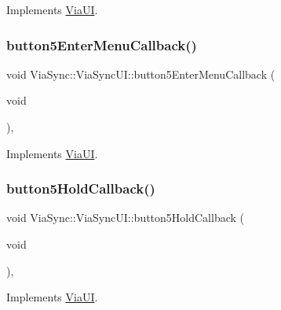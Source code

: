 Implements \mbox{\hyperlink{class_via_u_i_a4925f089aa720ca88d84246f434112e9}{Via\+UI}}.

\mbox{\label{class_via_sync_1_1_via_sync_u_i_ad02cd6e9495afcd256a3b3475809bf5b}} 
\subsubsection{\texorpdfstring{button5\+Enter\+Menu\+Callback()}{button5EnterMenuCallback()}}
{\footnotesize\ttfamily void Via\+Sync\+::\+Via\+Sync\+U\+I\+::button5\+Enter\+Menu\+Callback (\begin{DoxyParamCaption}\item[{void}]{ }\end{DoxyParamCaption})\hspace{0.3cm}{\ttfamily [override]}, {\ttfamily [virtual]}}



Implements \mbox{\hyperlink{class_via_u_i_adb40844fb1fa8e623f3a7eaecdbfad53}{Via\+UI}}.

\mbox{\label{class_via_sync_1_1_via_sync_u_i_adb9159f6ba3275b089b52f9315963f2c}} 
\subsubsection{\texorpdfstring{button5\+Hold\+Callback()}{button5HoldCallback()}}
{\footnotesize\ttfamily void Via\+Sync\+::\+Via\+Sync\+U\+I\+::button5\+Hold\+Callback (\begin{DoxyParamCaption}\item[{void}]{ }\end{DoxyParamCaption})\hspace{0.3cm}{\ttfamily [override]}, {\ttfamily [virtual]}}



Implements \mbox{\hyperlink{class_via_u_i_aee783713c816e3807514ee9b06b571b0}{Via\+UI}}.

